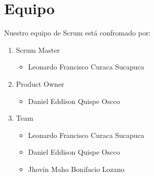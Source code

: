 \chapter{Equipo}
\setlength{\parindent}{0pt}

Nuestro equipo de Scrum está confromado por:

\begin{enumerate}
	\item Scrum Master
	\begin{itemize}
		\item Leonardo Francisco Curaca Sucapuca
	\end{itemize}
	\item Product Owner
	\begin{itemize}
		\item Daniel Eddison Quispe Oscco
	\end{itemize}
	\item Team
	\begin{itemize}
		\item Leonardo Francisco Curaca Sucapuca
		\item Daniel Eddison Quispe Oscco
		\item Jhovin Maho Bonifacio Lozano
	\end{itemize}
\end{enumerate}